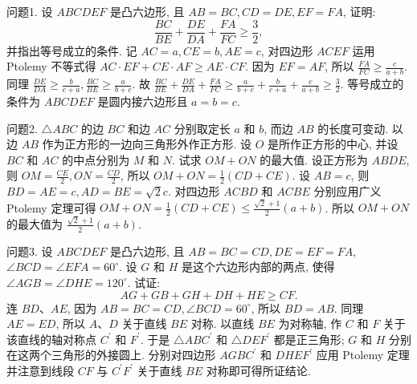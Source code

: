 
问题1. 设 $A B C D E F$ 是凸六边形, 且 $A B=B C, C D=D E, E F=F A$, 证明:
$$
\frac{B C}{B E}+\frac{D E}{D A}+\frac{F A}{F C} \geqslant \frac{3}{2},
$$
并指出等号成立的条件.
记 $A C=a, C E=b, A E=c$, 对四边形 $A C E F$ 运用 Ptolemy 不等式得 $A C \cdot E F+C E \cdot A F \geqslant A E \cdot C F$. 因为 $E F=A F$, 所以 $\frac{F A}{F C} \geqslant \frac{c}{a+b}$. 同理 $\frac{D E}{D A} \geqslant \frac{b}{c+a}, \frac{B C}{B E} \geqslant \frac{a}{b+c}$. 故 $\frac{B C}{B E}+\frac{D E}{D A}+\frac{F A}{F C} \geqslant \frac{a}{b+c}+\frac{b}{c+a}+\frac{c}{a+b} \geqslant \frac{3}{2}$. 等号成立的条件为 $A B C D E F$ 是圆内接六边形且 $a=b=c$.



问题2. $\triangle A B C$ 的边 $B C$ 和边 $A C$ 分别取定长 $a$ 和 $b$, 而边 $A B$ 的长度可变动.
以边 $A B$ 作为正方形的一边向三角形外作正方形.
设 $O$ 是所作正方形的中心, 并设 $B C$ 和 $A C$ 的中点分别为 $M$ 和 $N$. 试求 $O M+O N$ 的最大值.
设正方形为 $A B D E$, 则 $O M=\frac{C E}{2}, O N=\frac{C D}{2}$, 所以 $O M+O N= \frac{1}{2}(C D+C E)$. 设 $A B=c$, 则 $B D=A E=c, A D=B E=\sqrt{2} c$. 对四边形 $A C B D$ 和 $A C B E$ 分别应用广义 Ptolemy 定理可得 $O M+O N=\frac{1}{2}(C D+ C E) \leqslant \frac{\sqrt{2}+1}{2}(a+b)$. 所以 $O M+O N$ 的最大值为 $\frac{\sqrt{2}+1}{2}(a+b)$.



问题3. 设 $A B C D E F$ 是凸六边形, 且 $A B=B C=C D, D E=E F=F A$, $\angle B C D=\angle E F A=60^{\circ}$. 设 $G$ 和 $H$ 是这个六边形内部的两点, 使得 $\angle A G B=\angle D H E=120^{\circ}$. 试证:
$$
A G+G B+G H+D H+H E \geqslant C F .
$$
连 $B D 、 A E$, 因为 $A B=B C=C D, \angle B C D=60^{\circ}$, 所以 $B D=A B$. 同理 $A E=E D$, 所以 $A 、 D$ 关于直线 $B E$ 对称.
以直线 $B E$ 为对称轴, 作 $C$ 和 $F$ 关于该直线的轴对称点 $C^{\prime}$ 和 $F^{\prime}$. 于是 $\triangle A B C^{\prime}$ 和 $\triangle D E F^{\prime}$ 都是正三角形; $G$ 和 $H$ 分别在这两个三角形的外接圆上.
分别对四边形 $A G B C^{\prime}$ 和 $D H E F^{\prime}$ 应用 Ptolemy 定理并注意到线段 $C F$ 与 $C^{\prime} F^{\prime}$ 关于直线 $B E$ 对称即可得所证结论.



